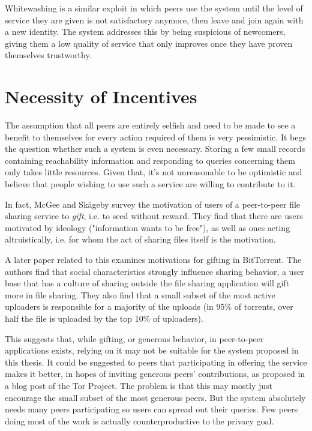 Whitewashing is a similar exploit in which peers use the system until the level
of service they are given is not satisfactory anymore, then leave and join again
with a new identity. The system addresses this by being suspicious of newcomers,
giving them a low quality of service that only improves once they have proven
themselves trustworthy.

\section{Necessity of Incentives}
The assumption that all peers are entirely selfish and need to be made to see a
benefit to themselves for every action required of them is very pessimistic. It
begs the question whether such a system is even necessary. Storing a few small
records containing reachability information and responding to queries concerning
them only takes little resources. Given that, it's not unreasonable to be
optimistic and believe that people wishing to use such a service are willing to
contribute to it.

In fact, McGee and Sk{\aa}geby\cite{mcgee2004gifting} survey the motivation of
users of a peer-to-peer file sharing service to \emph{gift}, i.e. to seed
without reward. They find that there are users motivated by ideology
("information wants to be free"), as well as ones acting altruistically, i.e.
for whom the act of sharing files itself is the motivation.

A later paper\cite{ripeanu2006gifting} related to this examines motivations for
gifting in BitTorrent. The authors find that social characteristics strongly
influence sharing behavior, a user base that has a culture of sharing outside
the file sharing application will gift more in file sharing. They also find that
a small subset of the most active uploaders is responsible for a majority of the
uploads (in 95\% of torrents, over half the file is uploaded by the top 10\% of
uploaders).

This suggests that, while gifting, or generous behavior, in peer-to-peer
applications exists, relying on it may not be suitable for the system proposed
in this thesis. It could be suggested to peers that participating in offering
the service makes it better, in hopes of inviting generous peers' contributions,
as proposed in a blog post of the Tor Project\cite{dingledine2009incentive_tor}.
The problem is that this may mostly just encourage the small subset of the most
generous peers. But the system absolutely needs many peers participating so
users can spread out their queries. Few peers doing most of the work is actually
counterproductive to the privacy goal.

